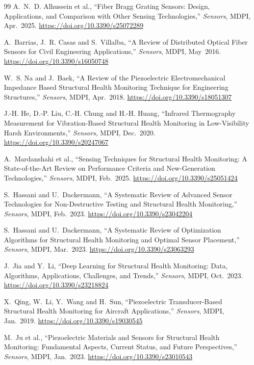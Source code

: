 \begin{thebibliography}{99}
A.~N.~D. Alhussein et al., ``Fiber Bragg Grating Sensors: Design, Applications, and Comparison with Other
Sensing Technologies,'' \emph{Sensors}, MDPI, Apr.~2025. \url{https://doi.org/10.3390/s25072289}

A.~Barrias, J.~R. Casas and S.~Villalba, ``A Review of Distributed Optical Fiber Sensors for Civil Engineering
Applications,'' \emph{Sensors}, MDPI, May~2016. \url{https://doi.org/10.3390/s16050748}

W.~S. Na and J.~Baek, ``A Review of the Piezoelectric Electromechanical Impedance Based Structural Health
Monitoring Technique for Engineering Structures,'' \emph{Sensors}, MDPI, Apr.~2018.
\url{https://doi.org/10.3390/s18051307}

J.-H. He, D.-P. Liu, C.-H. Chung and H.-H. Huang, ``Infrared Thermography Measurement for Vibration-Based
Structural Health Monitoring in Low-Visibility Harsh Environments,'' \emph{Sensors}, MDPI, Dec.~2020.
\url{https://doi.org/10.3390/s20247067}

A.~Mardanshahi et al., ``Sensing Techniques for Structural Health Monitoring: A State-of-the-Art Review on
Performance Criteria and New-Generation Technologies,'' \emph{Sensors}, MDPI, Feb.~2025.
\url{https://doi.org/10.3390/s25051424}

S.~Hassani and U.~Dackermann, ``A Systematic Review of Advanced Sensor Technologies for Non-Destructive
Testing and Structural Health Monitoring,'' \emph{Sensors}, MDPI, Feb.~2023.
\url{https://doi.org/10.3390/s23042204}

S.~Hassani and U.~Dackermann, ``A Systematic Review of Optimization Algorithms for Structural Health
Monitoring and Optimal Sensor Placement,'' \emph{Sensors}, MDPI, Mar.~2023.
\url{https://doi.org/10.3390/s23063293}

J.~Jia and Y.~Li, ``Deep Learning for Structural Health Monitoring: Data, Algorithms, Applications,
Challenges, and Trends,'' \emph{Sensors}, MDPI, Oct.~2023. \url{https://doi.org/10.3390/s23218824}

X.~Qing, W.~Li, Y.~Wang and H.~Sun, ``Piezoelectric Transducer-Based Structural Health Monitoring for
Aircraft Applications,'' \emph{Sensors}, MDPI, Jan.~2019. \url{https://doi.org/10.3390/s19030545}

M.~Ju et al., ``Piezoelectric Materials and Sensors for Structural Health Monitoring: Fundamental Aspects,
Current Status, and Future Perspectives,'' \emph{Sensors}, MDPI, Jan.~2023.
\url{https://doi.org/10.3390/s23010543}


\end{thebibliography}
